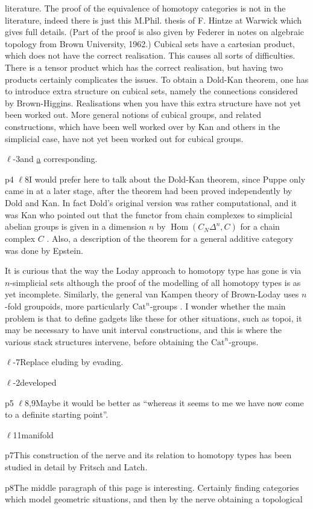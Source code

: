 literature. The proof of the equivalence of homotopy categories is not in the literature, indeed there is just this M.Phil. thesis of F. Hintze at Warwick which gives full details. (Part of the proof is also given by Federer in notes on algebraic topology from Brown University, 1962.) Cubical sets have a cartesian product, which does not have the correct realisation. This causes all sorts of difficulties. There is a tensor product which has the correct realisation, but having two products certainly complicates the issues. To obtain a Dold-Kan theorem, one has to introduce extra structure on cubical sets, namely the connections considered by Brown-Higgins. Realisations when you have this extra structure have not yet been worked out. More general notions of cubical groups, and related constructions, which have been well worked over by Kan and others in the simplicial case, have not yet been worked out for cubical groups.

$\ell$-3\qquad and \uline{a} corresponding.

p4 $\ell$8\qquad I would prefer here to talk about the Dold-Kan theorem, since Puppe only came in at a later stage, after the theorem had been proved independently by Dold and Kan. In fact Dold's original version was rather computational, and it was Kan who pointed out that the functor from chain complexes to simplicial abelian groups is given in a dimension $n$ by $\operatorname{Hom}(C_{N}\Delta^{n},C)$ for a chain complex $C$ . Also, a description of the theorem for a general additive category was done by Epstein.

It is curious that the way the Loday approach to homotopy type has gone is via $n$-simplicial sets although the proof of the modelling of all homotopy types is as yet incomplete. Similarly, the general van Kampen theory of Brown-Loday uses $n$-fold groupoids, more particularly $\mathrm{Cat}^{n}$-groups . I wonder whether the main problem is that to define gadgets like these for other situations, such as topoi, it may be necessary to have unit interval constructions, and this is where the various stack structures intervene, before obtaining the $\mathrm{Cat}^{n}$-groups.

$\ell$-7\qquad Replace eluding by evading.

$\ell$-2\qquad developed

p5 $\ell$8,9\quad Maybe it would be better as ``whereas it seems to me we have now come to a definite starting point''.

$\ell$11\qquad manifold

p7\qquad This construction of the nerve and its relation to homotopy types has been studied in detail by Fritsch and Latch.

p8\qquad The middle paragraph of this page is interesting. Certainly finding categories which model geometric situations, and then by the nerve obtaining a topological
